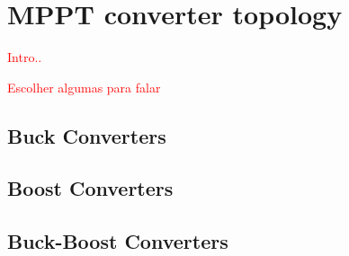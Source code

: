 \section{MPPT converter topology}

\textcolor{red}{Intro..}
\par
\textcolor{red}{Escolher algumas para falar}

\subsection{Buck Converters}

\subsection{Boost Converters}

\subsection{Buck-Boost Converters}

